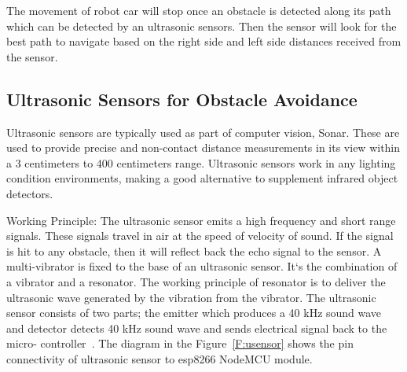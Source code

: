 The movement of robot car will stop once an obstacle is detected along its 
path which can be detected by an ultrasonic sensors. Then the sensor will 
look for the best path to navigate based on the right side and left side 
distances received from the sensor.

\subsection{Ultrasonic Sensors for Obstacle Avoidance}
Ultrasonic sensors are typically used as part of computer vision, Sonar. 
These are used to provide precise and non-contact distance measurements 
in its view within a 3 centimeters to 400 centimeters range. Ultrasonic 
sensors work in any lighting condition environments, making a good 
alternative to supplement infrared object detectors.

Working Principle: The ultrasonic sensor emits a high frequency and short 
range signals. These signals travel in air at the speed of velocity of 
sound. If the signal is hit to any obstacle, then it will reflect back the 
echo signal to the sensor. A multi-vibrator is fixed to the base of an 
ultrasonic sensor. It`s the combination of a vibrator and a resonator. The 
working principle of resonator is to  deliver the  ultrasonic wave generated 
by the vibration from the vibrator. The ultrasonic sensor consists of two 
parts; the emitter which produces a 40 kHz sound wave and detector detects 
40 kHz sound wave and sends electrical signal back to the micro-
controller~\cite{ijedr2016}. The diagram in the Figure~\ref{F:usensor} shows 
the pin connectivity of ultrasonic sensor to esp8266 NodeMCU module.

